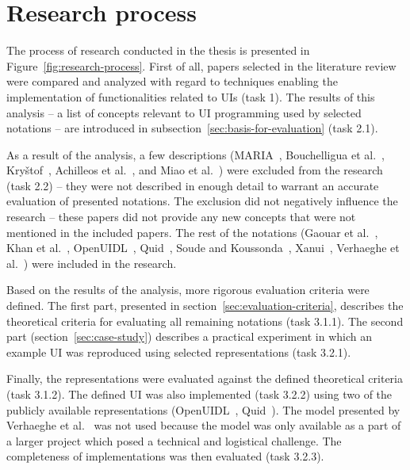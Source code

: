 \section{Research process}\label{sec:research-process}

The process of research conducted in the thesis is presented in Figure~\ref{fig:research-process}.
First of all, papers selected in the literature review were compared and analyzed with regard to techniques enabling the implementation of functionalities related to UIs (task 1).
The results of this analysis -- a list of concepts relevant to UI programming used by selected notations -- are introduced in subsection~\ref{sec:basis-for-evaluation} (task 2.1).

As a result of the analysis, a few descriptions (MARIA~\cite{Paterno2009, MariaPDF}, Bouchelligua et al.~\cite{Bouchelligua2010}, Kryštof~\cite{kryvstof2010lpgm}, Achilleos et al.~\cite{Achilleos2011}, and Miao et al.~\cite{Miao2017}) were excluded from the research (task 2.2) -- they were not described in enough detail to warrant an accurate evaluation of presented notations.
The exclusion did not negatively influence the research -- these papers did not provide any new concepts that were not mentioned in the included papers.
The rest of the notations (Gaouar et al.~\cite{Gaouar2018}, Khan et al.~\cite{Khan2021}, OpenUIDL~\cite{Moldovan2020}, Quid~\cite{molina2018quid, Molina2019}, Soude and Koussonda~\cite{Soude2022}, Xanui~\cite{hermida2016xanui}, Verhaeghe et al.~\cite{Verhaeghe2021visual, Verhaeghe2021behavior}) were included in the research.

Based on the results of the analysis, more rigorous evaluation criteria were defined.
The first part, presented in section~\ref{sec:evaluation-criteria}, describes the theoretical criteria for evaluating all remaining notations (task 3.1.1).
The second part (section~\ref{sec:case-study}) describes a practical experiment in which an example UI was reproduced using selected representations (task 3.2.1).

Finally, the representations were evaluated against the defined theoretical criteria (task 3.1.2).
The defined UI was also implemented (task 3.2.2) using two of the publicly available representations (OpenUIDL~\cite{Moldovan2020}, Quid~\cite{molina2018quid, Molina2019}).
The model presented by Verhaeghe et al.~\cite{Verhaeghe2021visual, Verhaeghe2021behavior} was not used because the model was only available as a part of a larger project which posed a technical and logistical challenge.
The completeness of implementations was then evaluated (task 3.2.3).

